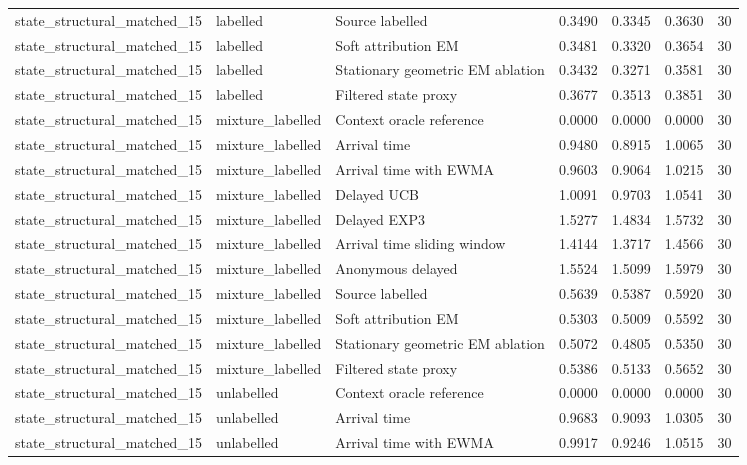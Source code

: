 \begin{tabular}{llllllr}
state\_structural\_matched\_15 & labelled & Source labelled & 0.3490 & 0.3345 & 0.3630 & 30 \\
state\_structural\_matched\_15 & labelled & Soft attribution EM & 0.3481 & 0.3320 & 0.3654 & 30 \\
state\_structural\_matched\_15 & labelled & Stationary geometric EM ablation & 0.3432 & 0.3271 & 0.3581 & 30 \\
state\_structural\_matched\_15 & labelled & Filtered state proxy & 0.3677 & 0.3513 & 0.3851 & 30 \\
state\_structural\_matched\_15 & mixture\_labelled & Context oracle reference & 0.0000 & 0.0000 & 0.0000 & 30 \\
state\_structural\_matched\_15 & mixture\_labelled & Arrival time & 0.9480 & 0.8915 & 1.0065 & 30 \\
state\_structural\_matched\_15 & mixture\_labelled & Arrival time with EWMA & 0.9603 & 0.9064 & 1.0215 & 30 \\
state\_structural\_matched\_15 & mixture\_labelled & Delayed UCB & 1.0091 & 0.9703 & 1.0541 & 30 \\
state\_structural\_matched\_15 & mixture\_labelled & Delayed EXP3 & 1.5277 & 1.4834 & 1.5732 & 30 \\
state\_structural\_matched\_15 & mixture\_labelled & Arrival time sliding window & 1.4144 & 1.3717 & 1.4566 & 30 \\
state\_structural\_matched\_15 & mixture\_labelled & Anonymous delayed & 1.5524 & 1.5099 & 1.5979 & 30 \\
state\_structural\_matched\_15 & mixture\_labelled & Source labelled & 0.5639 & 0.5387 & 0.5920 & 30 \\
state\_structural\_matched\_15 & mixture\_labelled & Soft attribution EM & 0.5303 & 0.5009 & 0.5592 & 30 \\
state\_structural\_matched\_15 & mixture\_labelled & Stationary geometric EM ablation & 0.5072 & 0.4805 & 0.5350 & 30 \\
state\_structural\_matched\_15 & mixture\_labelled & Filtered state proxy & 0.5386 & 0.5133 & 0.5652 & 30 \\
state\_structural\_matched\_15 & unlabelled & Context oracle reference & 0.0000 & 0.0000 & 0.0000 & 30 \\
state\_structural\_matched\_15 & unlabelled & Arrival time & 0.9683 & 0.9093 & 1.0305 & 30 \\
state\_structural\_matched\_15 & unlabelled & Arrival time with EWMA & 0.9917 & 0.9246 & 1.0515 & 30 \\

\end{tabular}
